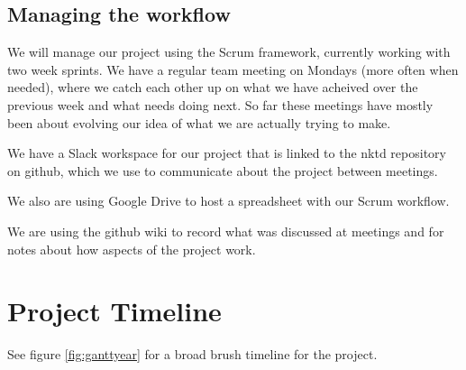 \documentclass[11pt, oneside]{article}
\newcounter{myWeekNum}
\newcommand{\myWeek}{\themyWeekNum
    \stepcounter{myWeekNum}
    \ifnum\themyWeekNum=53
         \setcounter{myWeekNum}{1}
    \else\fi
}
\begin{document}
\subsection*{Managing the workflow}

We will manage our project using the Scrum framework, currently
working with two week sprints. We have a regular team meeting on
Mondays (more often when needed), where we catch each other up on what
we have acheived over the previous week and what needs doing next. So
far these meetings have mostly been about evolving our idea of what we
are actually trying to make.

We have a Slack workspace for our project that is linked to the nktd
repository on github, which we use to communicate about the project
between meetings.

We also are using Google Drive to host a spreadsheet with our Scrum
workflow.

We are using the github wiki to record what was discussed at meetings
and for notes about how aspects of the project work.


\section*{Project Timeline}

See figure \ref{fig:ganttyear} for a broad brush timeline for the project.

\end{document}
